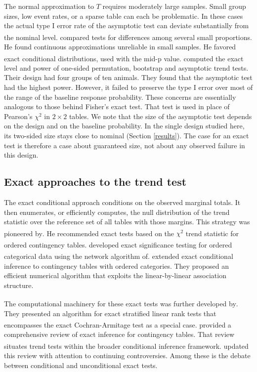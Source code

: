 \documentclass[
  11pt,
]{article}
\begin{document}
The normal approximation to \(T\) requires moderately large
samples. Small group sizes, low event rates, or a sparse
table can each be problematic. In these cases the actual type I error rate of the asymptotic test
can deviate substantially from the nominal level.\textsuperscript{} compared tests for differences among
several small proportions. He found continuous
approximations unreliable in small samples. He favored
exact conditional distributions, used with the mid-p
value.\textsuperscript{} computed the exact level and
power of one-sided permutation, bootstrap and asymptotic
trend tests. Their design had four groups of ten animals.
They found that the asymptotic test had the highest
power. However, it failed to preserve the type I error
over most of the range of the baseline response
probability. These concerns are essentially analogous to
those behind Fisher's exact test. That test is used in
place of Pearson's \(\chi^2\) in \(2 \times 2\) tables. We
note that the size of the asymptotic test depends on the
design and on the baseline probability. In the single
design studied here, its two-sided size stays close to
nominal
(Section \ref{results}). The case for an exact test is
therefore a case about guaranteed size, not about any
observed failure in this design.

\subsection{Exact approaches to the trend test}\label{exact-approaches-to-the-trend-test}

The exact conditional approach conditions on the observed
marginal totals. It then enumerates, or efficiently
computes, the null distribution of the trend statistic
over the reference set of all tables with those margins.
This strategy was pioneered by\textsuperscript{}. He
recommended exact tests based on the \(\chi^2\) trend
statistic for ordered contingency tables.\textsuperscript{}
developed exact significance testing for ordered
categorical data using the network algorithm of\textsuperscript{}.\textsuperscript{} extended exact
conditional inference to contingency tables with ordered
categories. They proposed an efficient numerical algorithm
that exploits the linear-by-linear association structure.

The computational machinery for these exact tests was
further developed by\textsuperscript{}. They presented an
algorithm for exact stratified linear rank tests that
encompasses the exact Cochran-Armitage test as a special
case.\textsuperscript{} provided a comprehensive review
of exact inference for contingency tables. That review
situates trend tests within the broader conditional
inference framework.\textsuperscript{} updated this
review with attention to continuing controversies. Among
these is the debate between conditional and unconditional
exact tests.
\end{document}
